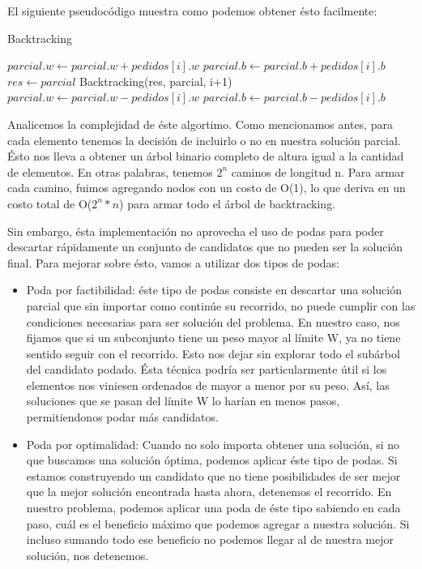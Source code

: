 El siguiente pseudocódigo muestra como podemos obtener ésto facilmente:

\begin{algorithm}
\caption{Backtracking}\label{selection}
\begin{algorithmic}[1]
   	\State $parcial.w \gets parcial.w + pedidos[i].w$
	  \State $parcial.b \gets parcial.b + pedidos[i].b$
    \State $res \gets parcial$
    \EndIf
    \State Backtracking(res, parcial, i+1)
    \State $parcial.w \gets parcial.w - pedidos[i].w$
	  \State $parcial.b \gets parcial.b - pedidos[i].b$

	 \EndFor
\EndProcedure
\end{algorithmic}
\end{algorithm}

Analicemos la complejidad de éste algortimo. Como mencionamos antes, para cada elemento tenemos la decisión de incluirlo o no en nuestra solución parcial. Ésto nos lleva a obtener un árbol binario completo de altura igual a la cantidad de elementos. En otras palabras, tenemos $2^{n}$ caminos de longitud n. Para armar cada camino, fuimos agregando nodos con un costo de O(1), lo que deriva en un costo total de O($2^{n} * n$) para armar todo el árbol de backtracking.

Sin embargo, ésta implementación no aprovecha el uso de podas para poder descartar rápidamente un conjunto de candidatos que no pueden ser la solución final. Para mejorar sobre ésto, vamos a utilizar dos tipos de podas:

\begin{itemize}
\item Poda por factibilidad: éste tipo de podas consiste en descartar una solución parcial que sin importar como continúe su recorrido, no puede cumplir con las condiciones necesarias para ser solución del problema. En nuestro caso, nos fijamos que si un subconjunto tiene un peso mayor al límite W, ya no tiene sentido seguir con el recorrido. Esto nos dejar sin explorar todo el subárbol del candidato podado. Ésta técnica podría ser particularmente útil si los elementos nos viniesen ordenados de mayor a menor por su peso. Así, las soluciones que se pasan del límite W lo harían en menos pasos, permitiendonos podar más candidatos.
\item Poda por optimalidad: Cuando no solo importa obtener una solución, si no que buscamos una solución óptima, podemos aplicar éste tipo de podas. Si estamos construyendo un candidato que no tiene posibilidades de ser mejor que la mejor solución encontrada hasta ahora, detenemos el recorrido. En nuestro problema, podemos aplicar una poda de éste tipo sabiendo en cada paso, cuál es el beneficio máximo que podemos agregar a nuestra solución. Si incluso sumando todo ese beneficio no podemos llegar al de nuestra mejor solución, nos detenemos.
\end{itemize}

